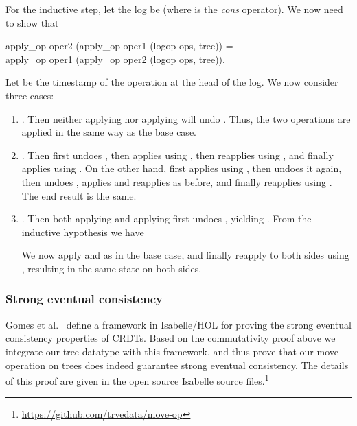 \documentclass[sigconf]{acmart}
\renewenvironment{isabelle}{%
  \medbreak\noindent%
  \renewcommand{\isanewline}{\\}%
  \begin{minipage}{\columnwidth}%
  \begin{isabellebody}%
  \begin{tabbing}%
}{%
  \end{tabbing}%
  \end{isabellebody}%
  \end{minipage}%
  \medbreak%
}
\begin{document}
For the inductive step, let the log be  (where \isa{\isacharhash} is the \emph{cons} operator).
We now need to show that
\begin{isabelle}
apply\_op oper2 (apply\_op oper1 (logop {\isacharhash} ops, tree)) =\\
apply\_op oper1 (apply\_op oper2 (logop {\isacharhash} ops, tree)).
\end{isabelle}
Let  be the timestamp of the operation at the head of the log.
We now consider three cases:
\begin{enumerate}
    \item {}.
        Then neither applying  nor applying  will undo .
        Thus, the two operations are applied in the same way as the base case.
    \item {}.
        Then  first undoes , then applies  using , then reapplies  using , and finally applies  using .
        On the other hand,  first applies  using , then undoes it again, then undoes , applies  and reapplies  as before, and finally reapplies  using .
        The end result is the same.
    \item {}.
        Then both applying  and applying  first undoes , yielding .
        From the inductive hypothesis we have
        \begin{quote}
        \end{quote}
        We now apply  and  as in the base case, and finally reapply  to both sides using , resulting in the same state on both sides.
\end{enumerate}

\subsubsection{Strong eventual consistency}

Gomes et al.~\cite{Gomes:2017gy} define a framework in Isabelle/HOL for proving the strong eventual consistency properties of CRDTs.
Based on the commutativity proof above we integrate our tree datatype with this framework, and thus prove that our move operation on trees does indeed guarantee strong eventual consistency.
The details of this proof are given in the open source Isabelle source files.\footnote{\url{https://github.com/trvedata/move-op}}
\end{document}
